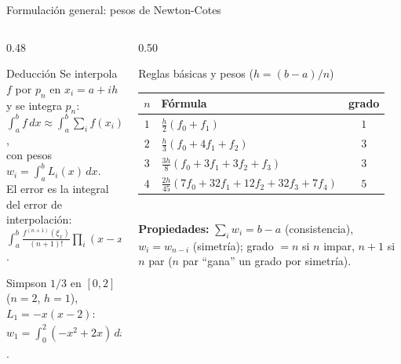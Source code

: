 \documentclass[aspectratio=169,10pt]{beamer}
\begin{document}
\begin{frame}{Formulación general: pesos de Newton-Cotes}
\begin{columns}[T]
\begin{column}{0.48\textwidth}
\begin{cardidea}{Deducción}{\faSuperscript}
{\footnotesize Se interpola $f$ por $p_n$ en $x_i=a+ih$ y se integra $p_n$:\\[0.5mm]
$\displaystyle\int_a^b f\,dx\approx\int_a^b\!\!\sum_i f(x_i)L_i(x)\,dx=\sum_{i=0}^n w_i f(x_i)$,\\[0.9mm]
con pesos $w_i=\displaystyle\int_a^b L_i(x)\,dx$.\\[1.0mm]
El error es la integral del error de interpolación:\\[0.3mm]
$\displaystyle\int_a^b\frac{f^{(n+1)}(\xi_x)}{(n+1)!}\prod_i(x-x_i)\,dx$.}
\end{cardidea}
\vspace{1mm}
\begin{cardnota}[\faListOl]
{\footnotesize Simpson $1/3$ en $[0,2]$ ($n{=}2$, $h{=}1$), $L_1=-x(x-2)$:\\[0.4mm]
$w_1=\int_0^2(-x^2{+}2x)\,dx=[-\tfrac{x^3}{3}{+}x^2]_0^2=\tfrac43=\tfrac h3\cdot4$.}
\end{cardnota}
\end{column}
\begin{column}{0.50\textwidth}
\begin{cardgear}{Reglas básicas y pesos ($h=(b-a)/n$)}{\faTable}
\centering
{\footnotesize\renewcommand{\arraystretch}{1.4}\setlength{\tabcolsep}{4pt}
\begin{tabular}{c|l|c}
$n$ & Fórmula & grado\\\hline
$1$ & $\tfrac{h}{2}(f_0+f_1)$ & $1$\\
$2$ & $\tfrac{h}{3}(f_0+4f_1+f_2)$ & $3$\\
$3$ & $\tfrac{3h}{8}(f_0+3f_1+3f_2+f_3)$ & $3$\\
$4$ & $\tfrac{2h}{45}(7f_0{+}32f_1{+}12f_2{+}32f_3{+}7f_4)$ & $5$\\
\end{tabular}}\\[1.4mm]
{\footnotesize \textbf{Propiedades:} $\sum_i w_i=b-a$ (consistencia), $w_i=w_{n-i}$ (simetría); grado $=n$ si $n$ impar, $n+1$ si $n$ par ($n$ par ``gana'' un grado por simetría).}
\end{cardgear}
\end{column}
\end{columns}
\end{frame}
\end{document}
